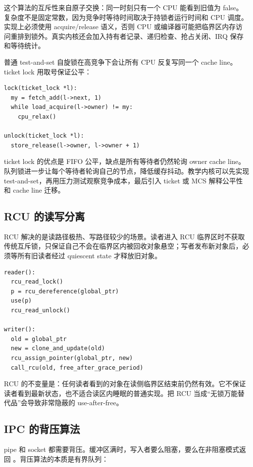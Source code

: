 这个算法的互斥性来自原子交换：同一时刻只有一个 CPU 能看到旧值为 false。复杂度不是固定常数，因为竞争时等待时间取决于持锁者运行时间和 CPU 调度。实现上必须使用 acquire/release 语义，否则 CPU 或编译器可能把临界区内存访问重排到锁外。真实内核还会加入持有者记录、递归检查、抢占关闭、IRQ 保存和等待统计。

普通 test-and-set 自旋锁在高竞争下会让所有 CPU 反复写同一个 cache line。ticket lock 用取号保证公平：

\begin{lstlisting}
lock(ticket_lock *l):
  my = fetch_add(l->next, 1)
  while load_acquire(l->owner) != my:
    cpu_relax()

unlock(ticket_lock *l):
  store_release(l->owner, l->owner + 1)
\end{lstlisting}

ticket lock 的优点是 FIFO 公平，缺点是所有等待者仍然轮询 owner cache line。队列锁进一步让每个等待者轮询自己的节点，降低缓存抖动。教学内核可以先实现 test-and-set，再用压力测试观察竞争成本，最后引入 ticket 或 MCS 解释公平性和 cache line 迁移。

\subsection{RCU 的读写分离}

RCU 解决的是读路径极热、写路径较少的场景。读者进入 RCU 临界区时不获取传统互斥锁，只保证自己不会在临界区内被回收对象悬空；写者发布新对象后，必须等所有旧读者经过 quiescent state 才释放旧对象。

\begin{lstlisting}
reader():
  rcu_read_lock()
  p = rcu_dereference(global_ptr)
  use(p)
  rcu_read_unlock()

writer():
  old = global_ptr
  new = clone_and_update(old)
  rcu_assign_pointer(global_ptr, new)
  call_rcu(old, free_after_grace_period)
\end{lstlisting}

RCU 的不变量是：任何读者看到的对象在读侧临界区结束前仍然有效。它不保证读者看到最新状态，也不适合读区内睡眠的普通实现。把 RCU 当成“无锁万能替代品”会导致非常隐蔽的 use-after-free。

\subsection{IPC 的背压算法}

pipe 和 socket 都需要背压。缓冲区满时，写入者要么阻塞，要么在非阻塞模式返回 。背压算法的本质是有界队列：

